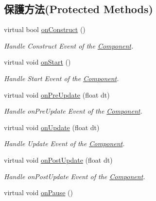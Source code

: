 \subsection*{保護方法(Protected Methods)}
\begin{DoxyCompactItemize}
\item 
virtual bool \hyperlink{class_i_dream_sky_1_1_component_1_1_owner_ad41887bbff0c68926b6e079c9c88fb48}{on\+Construct} ()
\begin{DoxyCompactList}\small\item\em Handle Construct Event of the \hyperlink{class_i_dream_sky_1_1_component}{Component}. \end{DoxyCompactList}\item 
virtual void \hyperlink{class_i_dream_sky_1_1_component_1_1_owner_ae7236357beeb16cbb937d98e4f311d5c}{on\+Start} ()\hypertarget{class_i_dream_sky_1_1_component_1_1_owner_ae7236357beeb16cbb937d98e4f311d5c}{}\label{class_i_dream_sky_1_1_component_1_1_owner_ae7236357beeb16cbb937d98e4f311d5c}

\begin{DoxyCompactList}\small\item\em Handle Start Event of the \hyperlink{class_i_dream_sky_1_1_component}{Component}. \end{DoxyCompactList}\item 
virtual void \hyperlink{class_i_dream_sky_1_1_component_1_1_owner_a493e3083c5600e177a2b641c723234aa}{on\+Pre\+Update} (float dt)
\begin{DoxyCompactList}\small\item\em Handle on\+Pre\+Update Event of the \hyperlink{class_i_dream_sky_1_1_component}{Component}. \end{DoxyCompactList}\item 
virtual void \hyperlink{class_i_dream_sky_1_1_component_1_1_owner_a0d01fb3bf56e46f99f51a0547b30a382}{on\+Update} (float dt)
\begin{DoxyCompactList}\small\item\em Handle Update Event of the \hyperlink{class_i_dream_sky_1_1_component}{Component}. \end{DoxyCompactList}\item 
virtual void \hyperlink{class_i_dream_sky_1_1_component_1_1_owner_af246be2df896c45b7596957d5073a986}{on\+Post\+Update} (float dt)
\begin{DoxyCompactList}\small\item\em Handle on\+Post\+Update Event of the \hyperlink{class_i_dream_sky_1_1_component}{Component}. \end{DoxyCompactList}\item 
virtual void \hyperlink{class_i_dream_sky_1_1_component_1_1_owner_a0364bd50241b29e6698f959ba0b21ff2}{on\+Pause} ()\hypertarget{class_i_dream_sky_1_1_component_1_1_owner_a0364bd50241b29e6698f959ba0b21ff2}{}\label{class_i_dream_sky_1_1_component_1_1_owner_a0364bd50241b29e6698f959ba0b21ff2}


\end{DoxyCompactItemize}
